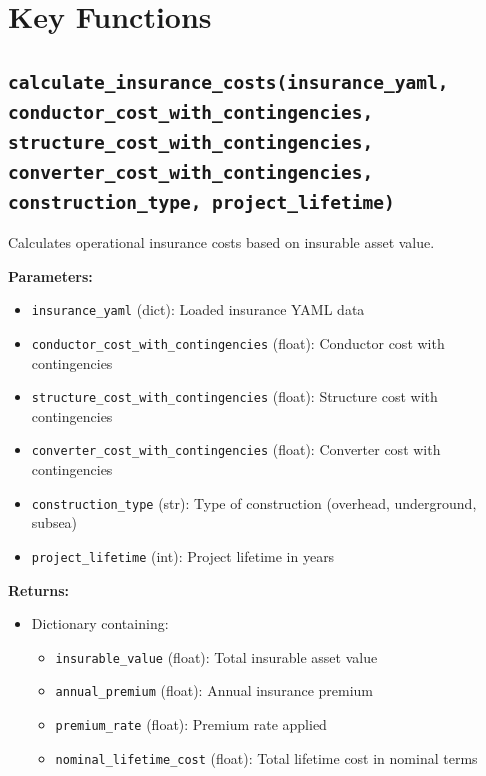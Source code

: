 \documentclass[12pt]{article}
\begin{document}
\section{Key Functions}

\subsection{\texttt{calculate\_insurance\_costs(insurance\_yaml, conductor\_cost\_with\_contingencies, structure\_cost\_with\_contingencies, converter\_cost\_with\_contingencies, construction\_type, project\_lifetime)}}

Calculates operational insurance costs based on insurable asset value.

\textbf{Parameters:}
\begin{itemize}
    \item \texttt{insurance\_yaml} (dict): Loaded insurance YAML data
    \item \texttt{conductor\_cost\_with\_contingencies} (float): Conductor cost with contingencies
    \item \texttt{structure\_cost\_with\_contingencies} (float): Structure cost with contingencies
    \item \texttt{converter\_cost\_with\_contingencies} (float): Converter cost with contingencies
    \item \texttt{construction\_type} (str): Type of construction (overhead, underground, subsea)
    \item \texttt{project\_lifetime} (int): Project lifetime in years
\end{itemize}

\textbf{Returns:}
\begin{itemize}
    \item Dictionary containing:
    \begin{itemize}
        \item \texttt{insurable\_value} (float): Total insurable asset value
        \item \texttt{annual\_premium} (float): Annual insurance premium
        \item \texttt{premium\_rate} (float): Premium rate applied
        \item \texttt{nominal\_lifetime\_cost} (float): Total lifetime cost in nominal terms
    \end{itemize}
\end{itemize}
\end{document}
